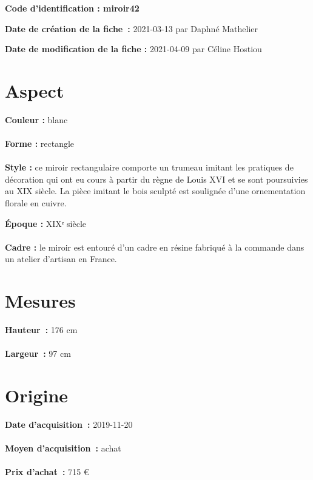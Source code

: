 
     {\bf \huge Code d’identification : miroir42} \\
    \newline \hr \begin{center} 
       
    \end{center} 
    \begin{itemize}
    
    \footnotesize {\item {\bf Date de création de la fiche :} 2021-03-13
    {par Daphné Mathelier}} 
    \footnotesize {\item {\bf Date de modification de la fiche :} 2021-04-09
    {par Céline Hostiou} \\}
    \end{itemize}
   \hr 
    \section* {Aspect} 
    {\bf \large Couleur :} blanc
    \\ \\ {\bf \large Forme :} rectangle 
    \\ \\ {\bf \large Style :} ce miroir rectangulaire comporte un trumeau imitant les
            pratiques de décoration qui ont eu cours à partir du règne de Louis XVI et se sont poursuivies au XIX
    {}
   siècle. La pièce imitant le bois sculpté est soulignée d'une
            ornementation florale en cuivre.
        
        {\bf \large Époque :} XIXᵉ siècle 
    \\ \\ {\bf \large Cadre :} le miroir est entouré d’un cadre en résine fabriqué à la commande dans un atelier d’artisan en France.
         
    \section* {Mesures}
     {\bf \large Hauteur :} 176 cm
   \\ \\ {\bf \large Largeur :} 97 cm 
  
    \section* {Origine}
    {\bf \large Date d’acquisition :} 2019-11-20 \\ \\
    {\bf \large Moyen d’acquisition :} achat \\ \\
     {\bf \large Prix d’achat :}
        715 € 
      
